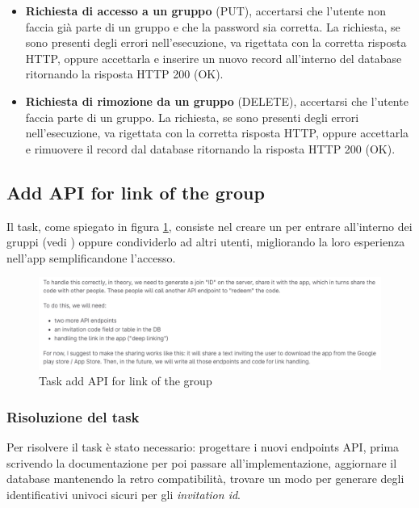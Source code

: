 \documentclass[main.tex]{subfiles}
\begin{document}
\begin{itemize}
    \item \textbf{Richiesta di accesso a un gruppo} (PUT), accertarsi che l'utente non faccia già parte di un gruppo e che la password sia corretta. La richiesta, se sono presenti degli errori nell'esecuzione, va rigettata con la corretta risposta HTTP, oppure accettarla e inserire un nuovo record all'interno del database ritornando la risposta HTTP 200 (OK).
    \item \textbf{Richiesta di rimozione da un gruppo} (DELETE), accertarsi che l'utente faccia parte di un gruppo. La richiesta, se sono presenti degli
errori nell’esecuzione, va rigettata con la corretta risposta HTTP, oppure accettarla e rimuovere il record dal database ritornando la risposta HTTP 200 (OK).
\end{itemize}
\newpage

\subsection{Add API for link of the group}
Il task, come spiegato in figura \ref{fig:add-link-issue}, consiste nel creare un  per entrare all'interno dei gruppi (vedi ) oppure condividerlo ad altri utenti, migliorando la loro esperienza nell'app semplificandone l'accesso.

\begin{figure}[H]
    \centering
    \includegraphics[width=1\linewidth]{img/add-link-task/add-link-issue.PNG}
    \caption{Task add API for link of the group}
    \label{fig:add-link-issue}
\end{figure}

\subsubsection{Risoluzione del task}
Per risolvere il task è stato necessario: progettare i nuovi endpoints API, prima scrivendo la documentazione per poi passare all'implementazione, aggiornare il database mantenendo la retro compatibilità, trovare un modo per generare degli identificativi univoci sicuri per gli \emph{invitation id}.
\end{document}
